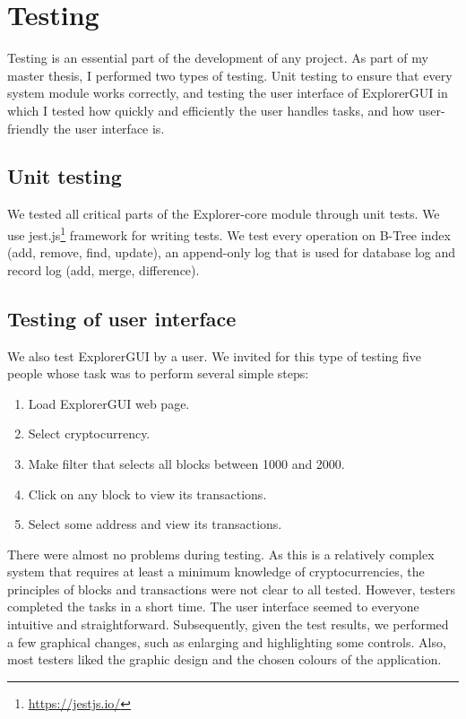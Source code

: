 \chapter{Testing}
Testing is an essential part of the development of any project. As part of my master thesis, I performed two types of testing. Unit testing to ensure that every system module works correctly, and testing the user interface of ExplorerGUI in which I tested how quickly and efficiently the user handles tasks, and how user-friendly the user interface is.

\section{Unit testing}
We tested all critical parts of the Explorer-core module through unit tests. We use jest.js\footnote{\url{https://jestjs.io/}} framework for writing tests. We test every operation on B-Tree index (add, remove, find, update), an append-only log that is used for database log and record log (add, merge, difference).


\section{Testing of user interface}
We also test ExplorerGUI by a user. We invited for this type of testing five people whose task was to perform several simple steps:
\begin{enumerate}
    \item Load ExplorerGUI web page.
    \item Select cryptocurrency.
    \item Make filter that selects all blocks between 1000 and 2000.
    \item Click on any block to view its transactions.
    \item Select some address and view its transactions.
\end{enumerate}
There were almost no problems during testing. As this is a relatively complex system that requires at least a minimum knowledge of cryptocurrencies, the principles of blocks and transactions were not clear to all tested. However, testers completed the tasks in a short time. The user interface seemed to everyone intuitive and straightforward. Subsequently, given the test results, we performed a few graphical changes, such as enlarging and highlighting some controls. Also, most testers liked the graphic design and the chosen colours of the application.